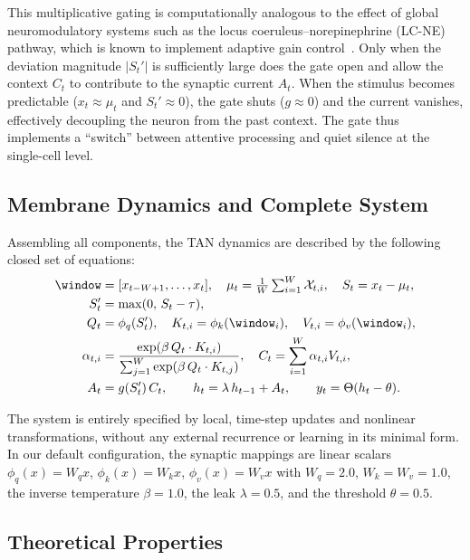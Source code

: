 This multiplicative gating is computationally analogous to the effect of global neuromodulatory systems such as the locus coeruleus--norepinephrine (LC-NE) pathway, which is known to implement adaptive gain control~\cite{aston2005,friston2010}. Only when the deviation magnitude $|S_t'|$ is sufficiently large does the gate open and allow the context $C_t$ to contribute to the synaptic current $A_t$. When the stimulus becomes predictable ($x_t \approx \mu_t$ and $S_t' \approx 0$), the gate shuts ($g \approx 0$) and the current vanishes, effectively decoupling the neuron from the past context. The gate thus implements a ``switch'' between attentive processing and quiet silence at the single-cell level.

\subsection{Membrane Dynamics and Complete System}

Assembling all components, the TAN dynamics are described by the following closed set of equations:
\begin{align}
\window &= [x_{t-W+1},\dots,x_t], \quad \mu_t = \tfrac{1}{W}\textstyle\sum_{i=1}^W \mathcal{X}_{t,i}, \quad S_t = x_t - \mu_t, \notag \\
S_t' &= \max(0,\, S_t - \tau), \notag \\
Q_t &= \phi_q(S_t'), \quad
K_{t,i} = \phi_k(\window_i), \quad
V_{t,i} = \phi_v(\window_i), \notag \\
\alpha_{t,i} &= \frac{\exp(\beta \, Q_t \cdot K_{t,i})}{\sum_{j=1}^W \exp(\beta \, Q_t \cdot K_{t,j})}, \quad
C_t = \sum_{i=1}^W \alpha_{t,i} V_{t,i}, \notag \\
A_t &= g(S_t') \, C_t, \qquad
h_t = \lambda \, h_{t-1} + A_t, \qquad
y_t = \Theta(h_t - \theta). \notag
\end{align}

The system is entirely specified by local, time-step updates and nonlinear transformations, without any external recurrence or learning in its minimal form. In our default configuration, the synaptic mappings are linear scalars $\phi_q(x) = W_q x$, $\phi_k(x) = W_k x$, $\phi_v(x) = W_v x$ with $W_q = 2.0$, $W_k = W_v = 1.0$, the inverse temperature $\beta = 1.0$, the leak $\lambda = 0.5$, and the threshold $\theta = 0.5$.

\subsection{Theoretical Properties}

